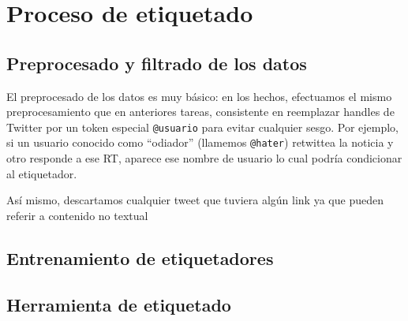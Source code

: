\section{Proceso de etiquetado}

\subsection{Preprocesado y filtrado de los datos}

El preprocesado de los datos es muy básico: en los hechos, efectuamos el mismo preprocesamiento que en anteriores tareas, consistente en reemplazar handles de Twitter por un token especial \verb|@usuario| para evitar cualquier sesgo. Por ejemplo, si un usuario conocido como ``odiador'' (llamemos \verb|@hater|) retwittea la noticia y otro responde a ese RT, aparece ese nombre de usuario lo cual podría condicionar al etiquetador.

Así mismo, descartamos cualquier tweet que tuviera algún link ya que pueden referir a contenido no textual


\subsection{Entrenamiento de etiquetadores}



%
%
\subsection{Herramienta de etiquetado}


